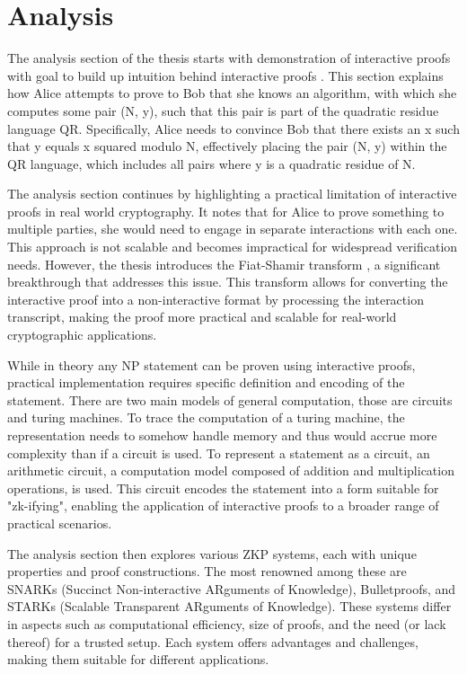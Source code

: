 \chapter{Analysis}

The analysis section of the thesis starts with demonstration of interactive
proofs with goal to build up intuition behind interactive proofs \cite{Goldwasser1989,youtubeMOOCLecture1}.
This section explains how Alice attempts to prove to Bob that she knows an
algorithm, with which she computes some pair (N, y), such that this pair is
part of the quadratic residue language QR. Specifically, Alice needs to
convince Bob that there exists an x such that y equals x squared modulo N,
effectively placing the pair (N, y) within the QR language, which includes all
pairs where y is a quadratic residue of N.

The analysis section continues by highlighting a practical limitation of
interactive proofs in real world cryptography. It notes that for Alice to
prove something to multiple parties, she would need to engage in separate
interactions with each one. This approach is not scalable and becomes
impractical for widespread verification needs. However, the thesis introduces
the Fiat-Shamir transform \cite{Fiat}, a significant breakthrough that addresses this
issue. This transform allows for converting the interactive proof into a
non-interactive format by processing the interaction transcript, making the
proof more practical and scalable for real-world cryptographic applications.

While in theory any NP statement \cite{Goldwasser1989} can be proven using
interactive proofs, practical implementation requires specific definition and
encoding of the statement. There are two main models of general computation,
those are circuits and turing machines. To trace the computation of a turing
machine, the representation needs to somehow handle memory and thus would accrue
more complexity than if a circuit is used. To represent a statement as a
circuit, an arithmetic circuit, a computation model composed of addition and
multiplication operations, is used. This circuit encodes the statement into a
form suitable for "zk-ifying", enabling the application of interactive proofs
to a broader range of practical scenarios.

The analysis section then explores various ZKP systems, each with unique
properties and proof constructions. The most renowned among these are SNARKs
(Succinct Non-interactive ARguments of Knowledge), Bulletproofs, and STARKs
(Scalable Transparent ARguments of Knowledge). These systems differ in aspects
such as computational efficiency, size of proofs, and the need (or lack
thereof) for a trusted setup. Each system offers advantages and challenges,
making them suitable for different applications.

